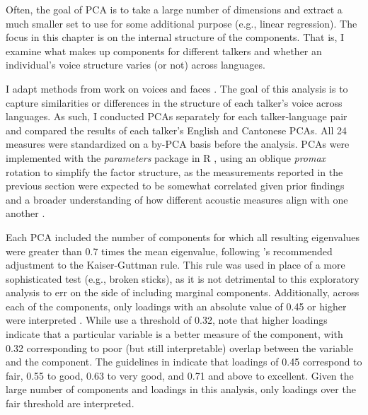 Often, the goal of PCA is to take a large number of dimensions and extract a much smaller set to use for some additional purpose (e.g., linear regression). The focus in this chapter is on the internal structure of the components. That is, I examine what makes up components for different talkers and whether an individual's voice structure varies (or not) across languages.  

I adapt methods from work on voices \citep{lee_2019_acoustic, lee_2020_language} and faces \citep{burton_2016_faces, turk_1991_eigenfaces}. The goal of this analysis is to capture similarities or differences in the structure of each talker's voice across languages. As such, I conducted PCAs separately for each talker-language pair and compared the results of each talker's English and Cantonese PCAs. All 24 measures were standardized on a by-PCA basis before the analysis. PCAs were implemented with the \textit{parameters} package \citep{ludecke_2020_parameters} in R \citep{r_2021}, using an oblique \textit{promax} rotation to simplify the factor structure, as the measurements reported in the previous section were expected to be somewhat correlated given prior findings \citep{lee_2019_acoustic} and a broader understanding of how different acoustic measures align with one another \citep{kreiman_2014_theory, kreiman_2021_validating}.

Each PCA included the number of components for which all resulting eigenvalues were greater than 0.7 times the mean eigenvalue, following \citeauthor{jolliffe_2002_pca}'s \citeyearpar{jolliffe_2002_pca} recommended adjustment to the Kaiser-Guttman rule. This rule was used in place of a more sophisticated test (e.g., broken sticks), as it is not detrimental to this exploratory analysis to err on the side of including marginal components. Additionally, across each of the components, only loadings with an absolute value of 0.45 or higher were interpreted \citep{lee_2019_acoustic, tabachnick_2013_statistics}. While \citet{lee_2019_acoustic} use a threshold of 0.32, \citet{tabachnick_2013_statistics} note that higher loadings indicate that a particular variable is a better measure of the component, with 0.32 corresponding to poor (but still interpretable) overlap between the variable and the component. The guidelines in \citet{tabachnick_2013_statistics} indicate that loadings of 0.45 correspond to fair, 0.55 to good, 0.63 to very good, and 0.71 and above to excellent. Given the large number of components and loadings in this analysis, only loadings over the fair threshold are interpreted.

